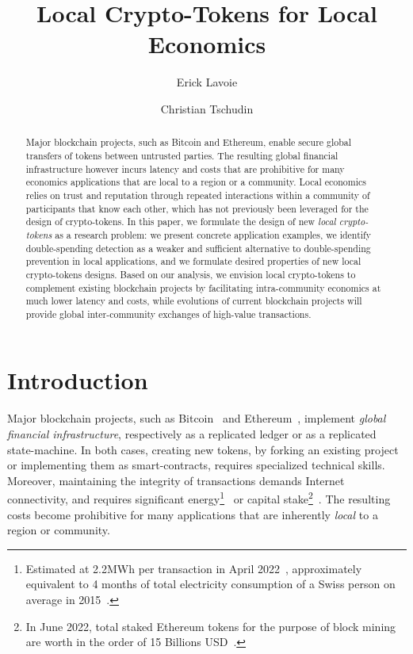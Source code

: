 \documentclass[sigconf,9pt]{acmart}
\begin{document}
\title{Local Crypto-Tokens for Local Economics}

\author{Erick Lavoie}

\author{Christian Tschudin}


\begin{abstract}
Major blockchain projects, such as Bitcoin and Ethereum, enable secure global transfers of tokens between untrusted parties. The resulting global financial infrastructure however incurs latency and costs that are prohibitive for many economics applications that are local to a region or a community. Local economics relies on trust and reputation through repeated interactions within a community of participants that know each other, which has not previously been leveraged for the design of crypto-tokens. In this paper, we formulate the design of new \textit{local crypto-tokens} as a research problem: we present concrete application examples, we identify double-spending detection as a weaker and sufficient alternative to double-spending prevention in local applications, and we formulate desired properties of new local crypto-tokens designs. Based on our analysis, we envision local crypto-tokens to complement existing blockchain projects by facilitating intra-community economics at much lower latency and costs, while evolutions of current blockchain projects will provide global inter-community exchanges of high-value transactions.
\end{abstract}

\maketitle

\section{Introduction}

Major blockchain projects, such as Bitcoin~\cite{nakamoto2008bitcoin} and Ethereum~\cite{buterin2014next}, implement \textit{global financial infrastructure}, respectively as a replicated ledger or as a replicated state-machine. In both cases, creating new tokens, by forking an existing project or implementing them as smart-contracts, requires specialized technical skills. Moreover, maintaining the integrity of transactions demands Internet connectivity, and requires significant energy\footnote{Estimated at 2.2MWh per transaction in April 2022~\cite{bitcoin-transaction-energy}, approximately equivalent to 4 months of total electricity consumption of a Swiss person on average in 2015~\cite{average-energy-consumption-per-capita-ch}.}~\cite{vranken2017sustainability,sedlmeir2020energy} or capital stake\footnote{In June 2022, total staked Ethereum tokens for the purpose of block mining are worth in the order of 15 Billions USD~\cite{proof-of-stake}.}~\cite{sedlmeir2020energy}. The resulting costs become prohibitive for many applications that are inherently \textit{local} to a region or community.
\end{document}
